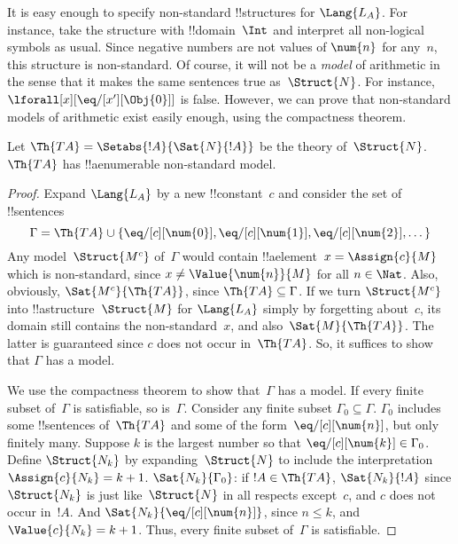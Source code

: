 \documentclass[../../../include/open-logic-section]{subfiles}
\begin{document}
\begin{explain}
It is easy enough to specify non-standard !!{structure}s for
$\Lang{L_A}$. For instance, take the structure with !!{domain}~$\Int$
and interpret all non-logical symbols as usual. Since negative numbers
are not values of $\num{n}$ for any~$n$, this structure is
non-standard. Of course, it will not be a \emph{model} of arithmetic
in the sense that it makes the same sentences true
as~$\Struct{N}$. For instance, $\lforall[x][\eq/[x'][\Obj{0}]]$ is
false.  However, we can prove that non-standard models of arithmetic
exist easily enough, using the compactness theorem.
\end{explain}

\begin{prop}
Let $\Th{TA} = \Setabs{!A}{\Sat{N}{!A}}$ be the theory
of~$\Struct{N}$. $\Th{TA}$ has !!a{enumerable} non-standard model.
\end{prop}

\begin{proof}
Expand $\Lang{L_A}$ by a new !!{constant}~$c$ and consider the set of
!!{sentence}s
\[
\Gamma = \Th{TA} \cup \{\eq/[c][\num{0}], \eq/[c][\num{1}],
\eq/[c][\num{2}], \dots\}
\]
Any model~$\Struct{M^c}$ of~$\Gamma$ would contain !!a{element}~$x =
\Assign{c}{M}$ which is non-standard, since $x \neq
\Value{\num{n}}{M}$ for all $n \in \Nat$. Also, obviously,
$\Sat{M^c}{\Th{TA}}$, since $\Th{TA} \subseteq \Gamma$. If we turn
$\Struct{M^c}$ into !!a{structure}~$\Struct{M}$ for $\Lang{L_A}$
simply by forgetting about~$c$, its domain still contains the
non-standard~$x$, and also~$\Sat{M}{\Th{TA}}$. The latter is
guaranteed since $c$ does not occur in~$\Th{TA}$. So, it suffices to
show that $\Gamma$ has a model.

We use the compactness theorem to show that~$\Gamma$ has a model. If
every finite subset of~$\Gamma$ is satisfiable, so
is~$\Gamma$. Consider any finite subset $\Gamma_0 \subseteq
\Gamma$. $\Gamma_0$ includes some !!{sentence}s of~$\Th{TA}$ and some
of the form~$\eq/[c][\num{n}]$, but only finitely many. Suppose $k$ is
the largest number so that $\eq/[c][\num{k}] \in \Gamma_0$. Define
$\Struct{N_k}$ by expanding~$\Struct{N}$ to include the
interpretation~$\Assign{c}{N_k} = k+1$. $\Sat{N_k}{\Gamma_0}$: if $!A
\in \Th{TA}$, $\Sat{N_k}{!A}$ since $\Struct{N_k}$ is just
like~$\Struct{N}$ in all respects except~$c$, and $c$ does not occur
in~$!A$. And $\Sat{N_k}{\eq/[c][\num{n}]}$, since $n \le k$, and
$\Value{c}{N_k} = k+1$. Thus, every finite subset of~$\Gamma$ is
satisfiable.
\end{proof}
\end{document}
